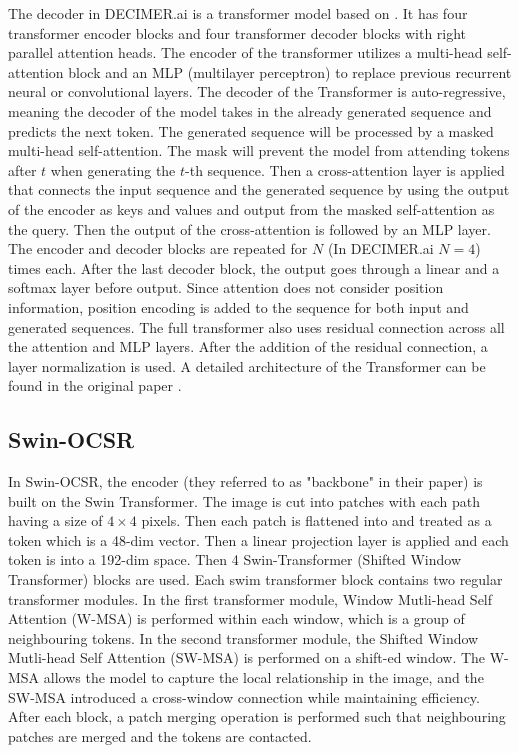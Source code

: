\documentclass{article}
\begin{document}
The decoder in DECIMER.ai is a transformer model based on \autocite{attention_is_all_you_need}. It has four transformer encoder blocks and four transformer decoder blocks with right parallel attention heads. \autocite{decimer} The encoder of the transformer utilizes a multi-head self-attention block and an MLP (multilayer perceptron) to replace previous recurrent neural or convolutional layers. The decoder of the Transformer is auto-regressive, meaning the decoder of the model takes in the already generated sequence and predicts the next token. The generated sequence will be processed by a masked multi-head self-attention. The mask will prevent the model from attending tokens after $t$ when generating the $t$-th sequence. Then a cross-attention layer is applied that connects the input sequence and the generated sequence by using the output of the encoder as keys and values and output from the masked self-attention as the query. Then the output of the cross-attention is followed by an MLP layer. The encoder and decoder blocks are repeated for $N$ (In DECIMER.ai $N=4$) times each. After the last decoder block, the output goes through a linear and a softmax layer before output. Since attention does not consider position information, position encoding is added to the sequence for both input and generated sequences. The full transformer also uses residual connection across all the attention and MLP layers. After the addition of the residual connection, a layer normalization is used. A detailed architecture of the Transformer can be found in the original paper \autocite{attention_is_all_you_need}.

\subsection{Swin-OCSR}
In Swin-OCSR, the encoder (they referred to as "backbone" in their paper) is built on the Swin Transformer. The image is cut into patches with each path having a size of $4 \times 4$ pixels. Then each patch is flattened into and treated as a token which is a 48-dim vector. Then a linear projection layer is applied and each token is into a 192-dim space. 
Then 4 Swin-Transformer (Shifted Window Transformer) \autocite{swin_tran} blocks are used. Each swim transformer block contains two regular transformer modules. In the first transformer module, Window Mutli-head Self Attention (W-MSA) is performed within each window, which is a group of neighbouring tokens. In the second transformer module, the Shifted Window Mutli-head Self Attention (SW-MSA) is performed on a shift-ed window. The W-MSA allows the model to capture the local relationship in the image, and the SW-MSA introduced a cross-window connection while maintaining efficiency. After each block, a patch merging operation is performed such that neighbouring patches are merged and the tokens are contacted. \autocite{swin_tran} \autocite{swinocsr}
\end{document}
